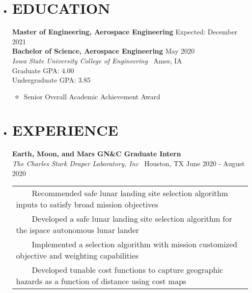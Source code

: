 \documentclass[overlapped, 11pt]{res}
\newcommand{\tabitem}{~~\textbullet~~}
\begin{document}
\address
{
    605 East 16th Street Pella, IA 50219 
    \textbar \ (641) 780-9473 
    \textbar \ carldevries@gmail.com 
}

\begin{resume}

    \begin{itemize}
    
        \item[]\section{EDUCATION}
        
            \textbf{Master of Engineering, Aerospace Engineering} \hfill Expected: December 2021 \\
            \textbf{Bachelor of Science, Aerospace Engineering} \hfill May 2020 \\
            \emph{Iowa State University College of Engineering} \textbar
                \ Ames, IA \\
            Graduate GPA: 4.00 \\
            Undergraduate GPA: 3.85 
            \begin{itemize}
                \item[] Senior Overall Academic Achievement Award
            \end{itemize}
                
           

        \item[]\section{EXPERIENCE}
        
            \textbf{Earth, Moon, and Mars GN\&C Graduate Intern}\\ 
            \emph{The Charles Stark Draper Laboratory, Inc} \textbar 
                \ Houston, TX \hfill June 2020 - August 2020
            \begin{tabular}{l}
                \tabitem Recommended safe lunar landing site selection algorithm inputs to satisfy broad mission objectives \\
                \tabitem Developed a safe lunar landing site selection algorithm for the ispace autonomous lunar lander \\
                \tabitem Implemented a selection algorithm with mission customized objective and weighting capabilities \\
                \tabitem Developed tunable cost functions to capture geographic hazards as a function of distance using cost maps \\
            \end{tabular}
            

\end{itemize}
\end{resume}
\end{document}
